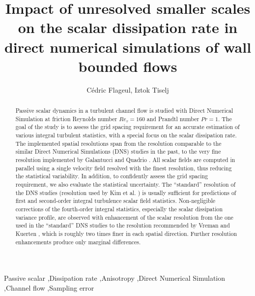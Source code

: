 \documentclass[review]{elsarticle}
\newcommand{\gqcite}{Galantucci and Quadrio \cite{galantucci2010very}}
\begin{document}
\begin{frontmatter}

\title{Impact of {\color{red}unresolved} smaller scales on the scalar dissipation rate in direct numerical simulations of wall bounded flows}

\author{C\'edric Flageul, Iztok Tiselj}
\address{Reactor Engineering Division, Jo\v{z}ef Stefan Institut, Ljubljana, Slovenia}

\begin{abstract}
Passive scalar dynamics in a turbulent channel flow is studied with Direct Numerical Simulation at friction Reynolds number $Re_\tau=160$ and Prandtl number $Pr=1$. The goal of the study is to assess the grid spacing requirement for an accurate estimation of various {\color{red}integral} turbulent statistics, with a special focus on the scalar dissipation rate. The implemented spatial resolutions span from the resolution comparable to the similar Direct Numerical Simulations (DNS) studies in the past, to the very fine resolution implemented by \gqcite. All scalar fields are computed in parallel using a single velocity field resolved with the finest resolution, thus reducing the statistical variability. In addition, to confidently assess the grid spacing requirement, we also evaluate the statistical uncertainty. The ``standard'' resolution of the DNS studies (resolution used by Kim et al. \cite{kim1987turbulence}) is usually sufficient for predictions of first and second-order {\color{red}integral} turbulence scalar field statistics. Non-negligible corrections of the fourth-order {\color{red}integral} statistics, especially the scalar dissipation variance profile, are observed with enhancement of the scalar resolution from the one used in  the ``standard'' DNS studies to the resolution recommended by Vreman and Kuerten \cite{vreman2014comparison}, which is roughly two times finer in each spatial direction. Further resolution enhancements produce only marginal differences.
\end{abstract}

\begin{keyword}
Passive scalar \sep Dissipation rate \sep Anisotropy \sep Direct Numerical Simulation \sep Channel flow \sep Sampling error
\end{keyword}

\end{frontmatter}
\end{document}
